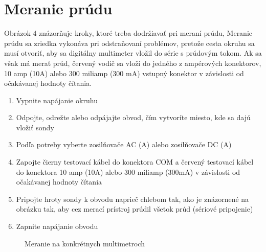 \documentclass[10pt]{article}
\begin{document}
\section{Meranie prúdu}
Obrázok 4 znázorňuje kroky, ktoré treba dodržiavať pri meraní prúdu, Meranie prúdu sa zriedka vykonáva pri odstraňovaní problémov, pretože cesta okruhu sa musí otvoriť, aby sa digitálny multimeter vložil do série s prúdovým tokom.
Ak sa však má merať prúd, červený vodič sa vloží do jedného z ampérových konektorov, 10 amp (10A) alebo 300 miliamp (300 mA) vstupný konektor v závislosti od očakávanej hodnoty čítania.
\begin{enumerate}
   \item Vypnite napájanie okruhu
   \item Odpojte, odrežte alebo odpájajte obvod, čím vytvoríte miesto, kde sa dajú vložiť sondy
   \item Podľa potreby vyberte zosilňovače AC (A) alebo zosilňovače DC (A)
   \item Zapojte čierny testovací kábel do konektora COM a červený testovací kábel do konektora 10 amp (10A) alebo 300 miliamp (300mA) v závislosti od očakávanej hodnoty čítania
   \item Pripojte hroty sondy k obvodu naprieč chlebom tak, ako je znázornené na obrázku tak, aby cez merací prístroj prúdil všetok prúd (sériové pripojenie)
   \item Zapnite napájanie obvodu
\end{enumerate}
\begin{figure}
\centering
{}
\caption{Meranie na konkrétnych multimetroch}
\label{Meranie na konkrétnych multimetroch}
\end{figure}
\end{document}
